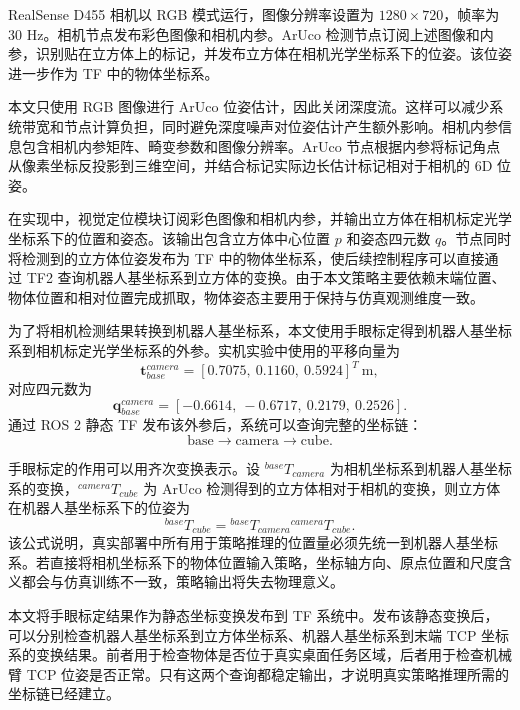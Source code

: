 \documentclass[
    type = bachelor,
    oneside,
    fontset = fandol
]{njuthesis}
\begin{document}
RealSense D455 相机以 RGB 模式运行，图像分辨率设置为 $1280\times720$，帧率为 30 Hz。相机节点发布彩色图像和相机内参。ArUco 检测节点订阅上述图像和内参，识别贴在立方体上的标记，并发布立方体在相机光学坐标系下的位姿。该位姿进一步作为 TF 中的物体坐标系。

本文只使用 RGB 图像进行 ArUco 位姿估计，因此关闭深度流。这样可以减少系统带宽和节点计算负担，同时避免深度噪声对位姿估计产生额外影响。相机内参信息包含相机内参矩阵、畸变参数和图像分辨率。ArUco 节点根据内参将标记角点从像素坐标反投影到三维空间，并结合标记实际边长估计标记相对于相机的 6D 位姿。

在实现中，视觉定位模块订阅彩色图像和相机内参，并输出立方体在相机标定光学坐标系下的位置和姿态。该输出包含立方体中心位置 $p$ 和姿态四元数 $q$。节点同时将检测到的立方体位姿发布为 TF 中的物体坐标系，使后续控制程序可以直接通过 TF2 查询机器人基坐标系到立方体的变换。由于本文策略主要依赖末端位置、物体位置和相对位置完成抓取，物体姿态主要用于保持与仿真观测维度一致。

为了将相机检测结果转换到机器人基坐标系，本文使用手眼标定得到机器人基坐标系到相机标定光学坐标系的外参。实机实验中使用的平移向量为
\begin{equation}
  \boldsymbol{t}_{base}^{camera} =
  [0.7075,\ 0.1160,\ 0.5924]^T \ \mathrm{m},
\end{equation}
对应四元数为
\begin{equation}
  \boldsymbol{q}_{base}^{camera} =
  [-0.6614,\ -0.6717,\ 0.2179,\ 0.2526].
\end{equation}
通过 ROS 2 静态 TF 发布该外参后，系统可以查询完整的坐标链：
\begin{equation}
  \mathrm{base} \rightarrow
  \mathrm{camera} \rightarrow
  \mathrm{cube}.
\end{equation}

手眼标定的作用可以用齐次变换表示。设 ${}^{base}T_{camera}$ 为相机坐标系到机器人基坐标系的变换，${}^{camera}T_{cube}$ 为 ArUco 检测得到的立方体相对于相机的变换，则立方体在机器人基坐标系下的位姿为
\begin{equation}
  {}^{base}T_{cube}
  =
  {}^{base}T_{camera}
  {}^{camera}T_{cube}.
\end{equation}
该公式说明，真实部署中所有用于策略推理的位置量必须先统一到机器人基坐标系。若直接将相机坐标系下的物体位置输入策略，坐标轴方向、原点位置和尺度含义都会与仿真训练不一致，策略输出将失去物理意义。

本文将手眼标定结果作为静态坐标变换发布到 TF 系统中。发布该静态变换后，可以分别检查机器人基坐标系到立方体坐标系、机器人基坐标系到末端 TCP 坐标系的变换结果。前者用于检查物体是否位于真实桌面任务区域，后者用于检查机械臂 TCP 位姿是否正常。只有这两个查询都稳定输出，才说明真实策略推理所需的坐标链已经建立。
\end{document}
